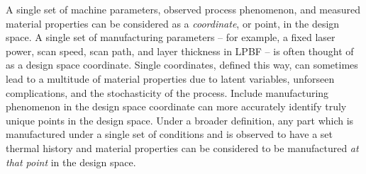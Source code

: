 A single set of machine parameters, observed process phenomenon, and measured material properties can be considered as a \textit{coordinate}, or point, in the design space. A single set of manufacturing parameters -- for example, a fixed laser power, scan speed, scan path, and layer thickness in LPBF -- is often thought of as a design space coordinate. Single coordinates, defined this way, can sometimes lead to a multitude of material properties due to latent variables, unforseen complications, and the stochasticity of the process. Include manufacturing phenomenon in the design space coordinate can more accurately identify truly unique points in the design space. Under a broader definition, any part which is manufactured under a single set of conditions and is observed to have a set thermal history and material properties can be considered to be manufactured \textit{at that point} in the design space.


